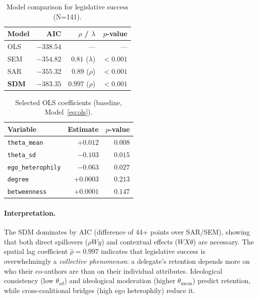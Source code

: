 \documentclass[11pt,a4paper]{article}
\begin{document}
\begin{table}[H]
\centering
\caption{Model comparison for legislative success (N=141).}
\label{tab:sdm-comparison}
\begin{tabular}{lrrr}
\toprule
Model & AIC       & $\rho$ / $\lambda$ & $p$-value \\
\midrule
OLS   & $-338.54$ & ---              & ---        \\
SEM   & $-354.82$ & $0.81$ ($\lambda$) & $<0.001$ \\
SAR   & $-355.32$ & $0.89$ ($\rho$)    & $<0.001$ \\
\textbf{SDM} & $\mathbf{-383.35}$ & $\mathbf{0.997}$ ($\rho$) & $<0.001$ \\
\bottomrule
\end{tabular}
\end{table}

\begin{table}[H]
\centering
\caption{Selected OLS coefficients (baseline, Model~\ref{eq:ols}).}
\label{tab:ols}
\begin{tabular}{lrr}
\toprule
Variable & Estimate & $p$-value \\
\midrule
\texttt{theta\_mean}       & $+0.012$ & $0.008$ \\
\texttt{theta\_sd}         & $-0.103$ & $0.015$ \\
\texttt{ego\_heterophily}  & $-0.063$ & $0.027$ \\
\texttt{degree}            & $+0.0003$ & $0.213$ \\
\texttt{betweenness}       & $+0.0001$ & $0.147$ \\
\bottomrule
\end{tabular}
\end{table}

\paragraph{Interpretation.} The SDM dominates by AIC (difference of 44+ points over SAR/SEM), showing that both direct spillovers ($\rho W y$) and contextual effects ($W X \theta$) are necessary. The spatial lag coefficient $\hat{\rho} = 0.997$ indicates that legislative success is overwhelmingly a \emph{collective phenomenon}: a delegate's retention depends more on who their co-authors are than on their individual attributes. Ideological consistency (low $\theta_{sd}$) and ideological moderation (higher $\theta_{\text{mean}}$) predict retention, while cross-coalitional bridges (high ego heterophily) reduce it.
\end{document}
